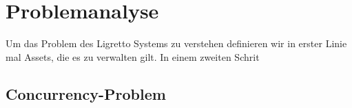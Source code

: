 \section{Problemanalyse}   %

Um das Problem des Ligretto Systems zu verstehen definieren wir in erster Linie mal Assets, die es zu verwalten gilt. In einem zweiten Schrit 


\subsection{Concurrency-Problem}
